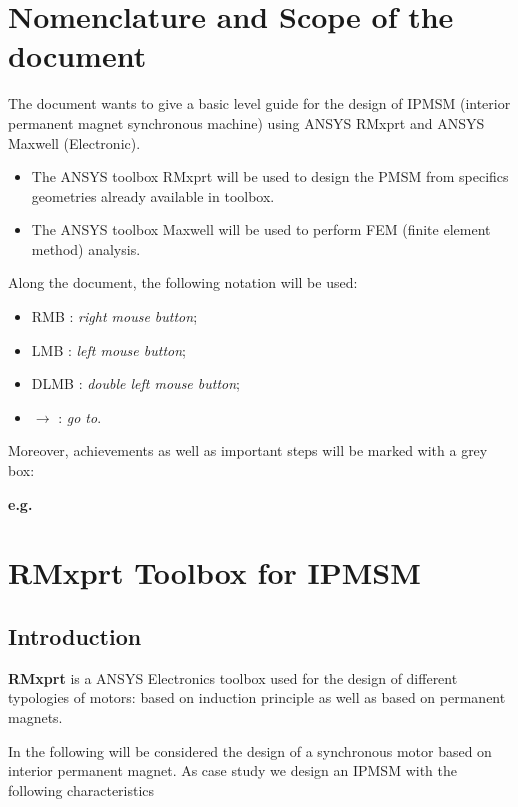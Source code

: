 \chapter{Nomenclature and Scope of the document}
The document wants to give a basic level guide for the design of IPMSM (interior permanent magnet synchronous machine) using ANSYS RMxprt and ANSYS Maxwell (Electronic).  
\begin{itemize}
	\item[--] The ANSYS toolbox RMxprt will be used to design the PMSM from specifics geometries already available in toolbox.
	\item[--] The ANSYS toolbox Maxwell will be used to perform FEM (finite element method) analysis.
\end{itemize}
\vspace{10mm}
Along the document, the following notation will be used:
\begin{itemize}
	\item[--] RMB : \textit{right mouse button};
	\item[--] LMB : \textit{left mouse button};
	\item[--] DLMB : \textit{double left mouse button};
	\item[--] $\rightarrow$ : \textit{go to}.
\end{itemize}
Moreover, achievements as well as important steps will be marked with a grey box:
\begin{mybox}
	\textbf{e.g.}
\end{mybox}

\chapter{RMxprt Toolbox for IPMSM}
\section{Introduction} 
\textbf{RMxprt} is a ANSYS Electronics toolbox used for the design of different typologies of motors: based on induction principle as well as based on permanent magnets. 

In the following will be considered the design of a synchronous motor based on interior permanent magnet. As case study we design an IPMSM with the following characteristics


